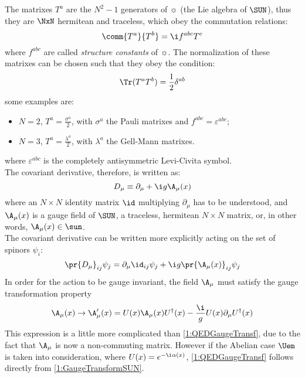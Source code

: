 The matrixes $T^a$ are the $N^2-1$ generators of $\sun$ (the Lie algebra of $\SUN$), thus they are $\NxN$ hermitean and traceless, which obey the commutation relations:
\begin{equation}
    \comm{T^a}{T^b} = \i f^{abc}T^c \label{1:StrConstSUN}
\end{equation}
where $f^{abc}$ are called \emph{structure constants} of $\sun$. The normalization of these matrixes can be chosen such that they obey the condition:
\begin{equation}
    \Tr(T^aT^b) = \frac12\delta^{ab} \label{1:NormCondSUN}
\end{equation}
some examples are:
\begin{itemize}
    \item $N=2$, $T^a=\frac{\sigma^a}{2}$, with $\sigma^a$ the Pauli matrixes and $f^{abc}=\varepsilon^{abc}$;
    \item $N=3$, $T^a=\frac{\lambda^a}{2}$, with $\lambda^a$ the Gell-Mann matrixes.
\end{itemize}
where $\varepsilon^{abc}$ is the completely antisymmetric Levi-Civita symbol.\\
The covariant derivative, therefore, is written as:
\begin{equation}
    D_\mu \equiv \partial_\mu + \i g \A_\mu(x) \label{1:CovDeriv}
\end{equation}
where an $N\times N$ identity matrix $\id$ multiplying $\partial_\mu$ has to be understood, and $\A_\mu(x)$ is a gauge field of $\SUN$, \ie a traceless, hermitean $N\times N$ matrix, or, in other words, $\A_\mu(x)\in\sun$.\\
The covariant derivative can be written more explicitly acting on the set of spinors $\psi_i$:
\begin{equation*}
    \pr{D_\mu}_{ij}\psi_j = \partial_\mu \id_{ij}\psi_j + \i g \pr{\A_\mu(x)}_{ij}\psi_j
\end{equation*}
In order for the action to be gauge invariant, the field $\A_\mu$ must satisfy the gauge transformation property
\begin{equation}
    \A_\mu(x) \rightarrow \A_\mu'(x) = U(x)\A_\mu(x)U^\dagger(x) - \frac{\i}{g}U(x)\partial_\mu U^\dagger(x) \label{1:GaugeTransformSUN}
\end{equation}
This expression is a little more complicated than \eqref{1:QEDGaugeTransf}, due to the fact that $\A_\mu$ is now a non-commuting matrix. However if the Abelian case $\Uem$ is taken into consideration, where $U(x)=e^{-\i\alpha(x)}$, \eqref{1:QEDGaugeTransf} follows directly from \eqref{1:GaugeTransformSUN}.\\

